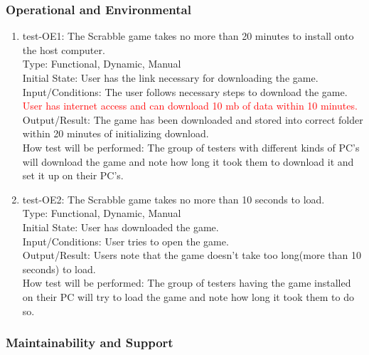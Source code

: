 \documentclass[12pt, titlepage]{article}
\begin{document}
\subsubsection{Operational and Environmental}
\begin{enumerate}

\item{test-OE1: The Scrabble game takes no more than 20 minutes to install onto the host computer.}\\
    Type: Functional, Dynamic, Manual\\ %
    Initial State: User has the link necessary for downloading the game.\\
    Input/Conditions: The user follows necessary steps to download the game. \textcolor{red}{User has internet access and can download 10 mb of data within 10 minutes.}\\
    Output/Result: The game has been downloaded and stored into correct folder within 20 minutes of initializing download. \\
    How test will be performed: The group of testers with different kinds of PC's will download the game and note how long it took them to download it and set it up on their PC's.\\
    
\item{test-OE2: The Scrabble game takes no more than 10 seconds to load.}\\
    Type: Functional, Dynamic, Manual\\ %
    Initial State: User has downloaded the game.\\
    Input/Conditions: User tries to open the game.\\
    Output/Result: Users note that the game doesn't take too long(more than 10 seconds) to load. \\
    How test will be performed: The group of testers having the game installed on their PC will try to load the game and note how long it took them to do so.\\
    
\end{enumerate}

\subsubsection{Maintainability and Support}
\end{document}
